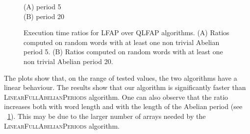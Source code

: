 \documentclass[3p]{elsarticle}
\begin{document}
\begin{figure}
\begin{center}
\large{(A) period 5}
~\\
\large{(B) period 20}
\end{center}
\caption{\label{fig-ratio3}Execution time ratios for LFAP over QLFAP algorithms. 
 (A) Ratios computed on random words with at least one non trivial Abelian period 5. (B) Ratios computed on random words with at least one non trivial Abelian period 20.}
\end{figure}

The plots show that, on the range of tested values, the two algorithms
 have a linear behaviour.
The results show that our algorithm is significantly faster than 
 \textsc{LinearFullAbelianPeriods} algorithm. 
One can also observe that the ratio increases both with word length
 and with the length of the Abelian period (see \figurename~\ref{fig-ratio3}).
This may be due to the larger number of arrays needed by the  \textsc{LinearFullAbelianPeriods} algorithm. 
\end{document}
